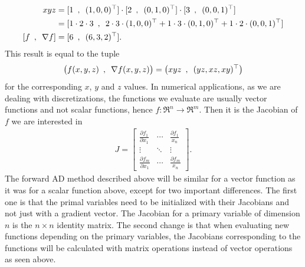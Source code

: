\begin{align*}
    xyz &= [1\hspace{0.5em},\hspace{0.5em}(1,0,0)^\top]\cdot [2\hspace{0.5em},\hspace{0.5em}(0,1,0)^\top]\cdot
    [3\hspace{0.5em},\hspace{0.5em}(0,0,1)^\top] \\
    &=[1\cdot 2\cdot 3\hspace{0.5em},\hspace{0.5em}2\cdot3\cdot(1,0,0)^\top + 1\cdot3\cdot(0,1,0)^\top + 1\cdot2\cdot(0,0,1)^\top] \\
    [f\hspace{0.5em},\hspace{0.5em}\nabla f] &= [6\hspace{0.5em},\hspace{0.5em}(6,3,2)^\top].
\end{align*}
This result is equal to the tuple
\begin{equation*}
    \big(f(x,y,z) \hspace{0.5em},\hspace{0.5em} \nabla f(x,y,z)\big) = \big(xyz \hspace{0.5em},\hspace{0.5em} (yz,xz,xy)^\top\big)
\end{equation*}
for the corresponding $x$, $y$ and $z$ values. In numerical applications, as we are dealing with discretizations, the functions we evaluate are usually  vector functions and not scalar functions, hence $f: \Re^n \rightarrow \Re^m$. Then it is the Jacobian of $f$ we are interested in
\begin{align*}
    J  =
    \begin{bmatrix}
        \frac{\partial f_1}{\partial x_1} & \dotsb & \frac{\partial f_1}{x_n}\\
        \vdots & \ddots & \vdots \\
        \frac{\partial f_m}{\partial x_1} & \dotsb & \frac{\partial f_m}{x_n}
    \end{bmatrix}.
\end{align*}
The forward AD method described above will be similar for a vector function as it was for a scalar function above, except for two important differences. The first one is that the primal variables need to be initialized with their Jacobians and not just with a gradient vector. The Jacobian for a primary variable of dimension $n$ is the $n \times n$ identity matrix. The second change is that when evaluating new functions depending on the primary variables, the Jacobians corresponding to the functions will be calculated with matrix operations instead of vector operations as seen above. 

